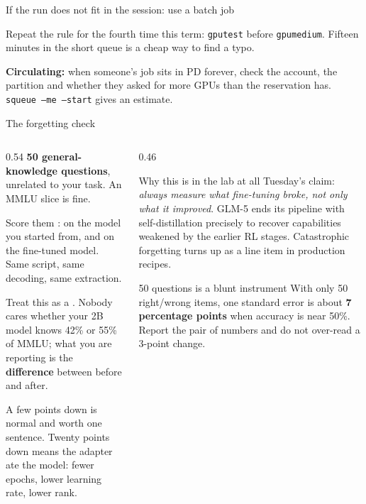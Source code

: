 \documentclass[aspectratio=169,10pt]{beamer}
\begin{document}
\begin{frame}[fragile,shrink=12]{If the run does not fit in the session: use a batch job}
{  Repeat the rule for the fourth time this term: \texttt{gputest} before
  \texttt{gpumedium}. Fifteen minutes in the short queue is a cheap way to find
  a typo.

  \textbf{Circulating:} when someone's job sits in PD forever, check the
  account, the partition and whether they asked for more GPUs than the
  reservation has. \texttt{squeue --me --start} gives an estimate.}
\end{frame}

\fi
\begin{frame}[shrink=11]{The forgetting check}
  \begin{columns}[T]
    \begin{column}{0.54\textwidth}
      \textbf{50 general-knowledge questions}, unrelated to your task. An MMLU
      slice is fine.
      \vspace{0.4em}

      Score them : on the model you started from, and on the
      fine-tuned model. Same script, same decoding, same extraction.
      \vspace{0.6em}

      Treat this as a . Nobody cares whether your 2B model
      knows 42\% or 55\% of MMLU; what you are reporting is the
      \textbf{difference} between before and after.
      \vspace{0.6em}

      A few points down is normal and worth one sentence. Twenty points down
      means the adapter ate the model: fewer epochs, lower learning rate, lower
      rank.
    \end{column}
    \begin{column}{0.46\textwidth}
      \begin{block}{Why this is in the lab at all}
        \small
        Tuesday's claim: \emph{always measure what fine-tuning broke, not only
        what it improved}.
        \vspace{0.4em}
        GLM-5 ends its pipeline with self-distillation precisely to recover
        capabilities weakened by the earlier RL stages. Catastrophic forgetting
        turns up as a line item in production recipes.
      \end{block}
      \vspace{0.3em}
      \begin{block}{50 questions is a blunt instrument}
        \small
        With only 50 right/wrong items, one standard error is about
        \textbf{7 percentage points} when accuracy is near 50\%.
        Report the pair of numbers and do not over-read a 3-point change.
      \end{block}
    \end{column}
  \end{columns}
\end{frame}
\end{document}
